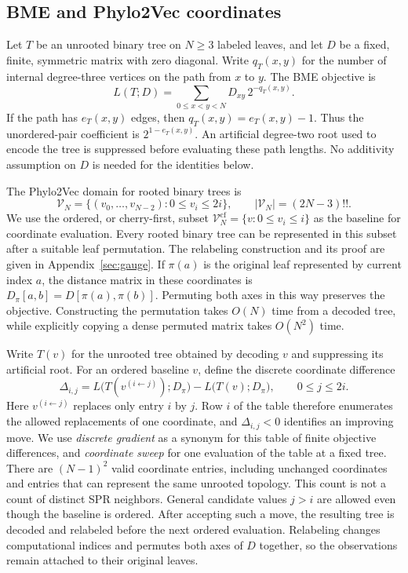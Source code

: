\documentclass[11pt,a4paper]{article}
\makeatletter
\DeclareRobustCommand{\_}{\ifmmode\nfss@text{\textunderscore}\else\textunderscore\allowbreak\fi}
\theoremstyle{definition}
\makeatother
\begin{document}
\subsection{BME and Phylo2Vec coordinates}
\label{sec:coordinates}

Let $T$ be an unrooted binary tree on $N\geq3$ labeled leaves, and let $D$ be a fixed, finite, symmetric matrix with zero diagonal.
Write $q_T(x,y)$ for the number of internal degree-three vertices on the path from $x$ to $y$.
The BME objective is
\begin{equation}
 L(T;D)=\sum_{0\leq x<y<N}D_{xy}\,2^{-q_T(x,y)}.
 \label{eq:pauplin}
\end{equation}
If the path has $e_T(x,y)$ edges, then $q_T(x,y)=e_T(x,y)-1$.
Thus the unordered-pair coefficient is $2^{1-e_T(x,y)}$.
An artificial degree-two root used to encode the tree is suppressed before evaluating these path lengths.
No additivity assumption on $D$ is needed for the identities below.

The Phylo2Vec domain for rooted binary trees is
\begin{equation}
 \mathcal V_N=\{(v_0,\ldots,v_{N-2}):0\leq v_i\leq2i\},
 \qquad |\mathcal V_N|=(2N-3)!!.
 \label{eq:phylo2vec_space}
\end{equation}
We use the ordered, or cherry-first, subset
$\mathcal V_N^{\mathrm{cf}}=\{v:0\leq v_i\leq i\}$ as the baseline for coordinate evaluation.
Every rooted binary tree can be represented in this subset after a suitable leaf permutation.
The relabeling construction and its proof are given in Appendix~\ref{sec:gauge}.
If $\pi(a)$ is the original leaf represented by current index $a$, the distance matrix in these coordinates is
$D_\pi[a,b]=D[\pi(a),\pi(b)]$.
Permuting both axes in this way preserves the objective.
Constructing the permutation takes $O(N)$ time from a decoded tree, while explicitly copying a dense permuted matrix takes $O(N^2)$ time.

Write $T(v)$ for the unrooted tree obtained by decoding $v$ and suppressing its artificial root.
For an ordered baseline $v$, define the discrete coordinate difference
\begin{equation}
 \Delta_{i,j}
 =L\bigl(T(v^{(i\leftarrow j)});D_\pi\bigr)
  -L\bigl(T(v);D_\pi\bigr),\qquad 0\leq j\leq2i.
 \label{eq:discrete_gradient}
\end{equation}
Here $v^{(i\leftarrow j)}$ replaces only entry $i$ by $j$.
Row $i$ of the table therefore enumerates the allowed replacements of one coordinate, and $\Delta_{i,j}<0$ identifies an improving move.
We use \emph{discrete gradient} as a synonym for this table of finite objective differences, and \emph{coordinate sweep} for one evaluation of the table at a fixed tree.
There are $(N-1)^2$ valid coordinate entries, including unchanged coordinates and entries that can represent the same unrooted topology.
This count is not a count of distinct SPR neighbors.
General candidate values $j>i$ are allowed even though the baseline is ordered.
After accepting such a move, the resulting tree is decoded and relabeled before the next ordered evaluation.
Relabeling changes computational indices and permutes both axes of $D$ together, so the observations remain attached to their original leaves.
\end{document}
